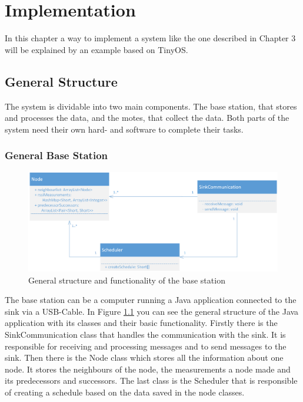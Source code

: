 \chapter{Implementation}

In this chapter a way to implement a system like the one described in Chapter 3 will be explained by an example based on TinyOS.    

\section{General Structure}
The system is dividable into two main components. The base station, that stores and processes the data, and the motes, that collect the data. Both parts of the system need their own hard- and software to complete their tasks.  
\subsection{General Base Station}

\begin{figure}[htbp]
	\centering
    \includegraphics[scale=0.7]{content/images/BaseStation/Klassendiagram}
   	\caption{General structure and functionality of the base station}
    \label{fig:bsKlassen}
\end{figure}

The base station can be a computer running a Java application connected to the sink via a USB-Cable. In Figure \ref{fig:bsKlassen} you can see the general structure of the Java application with its classes and their basic functionality. Firstly there is the SinkCommunication class that handles the communication with the sink. It is responsible for receiving and processing messages and to send messages to the sink. Then there is the Node class which stores all the information about one node. It stores the neighbours of the node, the measurements a node made and its predecessors and successors. The last class is the Scheduler that is responsible of creating a schedule based on the data saved in the node classes.  
